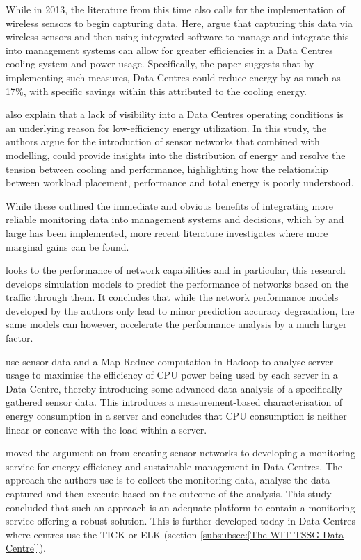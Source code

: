 \documentclass[12pt]{scrartcl}
\begin{document}
While in 2013, the literature from this time also calls for the implementation of wireless sensors to begin capturing data. Here, \citet{edssch.qt9c84f49g20130101} argue that capturing this data via wireless sensors and then using integrated software to manage and integrate this into management systems can allow for greater efficiencies in a Data Centres cooling system and power usage. Specifically, the paper suggests that by implementing such measures, Data Centres could reduce energy by as much as 17\%, with specific savings within this attributed to the cooling energy.

\citet{edsjsr.4134817120120101} also explain that a lack of visibility into a Data Centres operating conditions is an underlying reason for low-efficiency energy utilization. In this study, the authors argue for the introduction of sensor networks that combined with modelling, could provide insights into the distribution of energy and resolve the tension between cooling and performance, highlighting how the relationship between workload placement, performance and total energy is poorly understood.    

While these outlined the immediate and obvious benefits of integrating more reliable monitoring data into management systems and decisions, which by and large has been implemented, more recent literature investigates where more marginal gains can be found.  

\citet{edsdoj.47fdd5c4e23a43e3aa37ddd2fb75d82b20160101} looks to the performance of network capabilities and in particular, this research develops simulation models to predict the performance of networks based on the traffic through them. It concludes that while the  network performance models developed by the authors only lead to minor prediction accuracy degradation, the same models can however, accelerate the performance analysis by a much larger factor. 

\citet{edsarx.1402.080420140101} use sensor data and a Map-Reduce computation in Hadoop to analyse server usage to maximise the efficiency of CPU power being used by each server in a Data Centre, thereby introducing some advanced data analysis of a specifically gathered sensor data. This introduces a measurement-based characterisation of energy consumption in a server and concludes that CPU consumption is neither linear or concave with the load within a server. 

\citet{edsbas.DFD37F4F20160101} moved the argument on from creating sensor networks to developing a monitoring service for energy efficiency and sustainable management in Data Centres. The approach the authors use is to collect the monitoring data, analyse the data captured and then execute based on the outcome of the analysis. This study concluded that such an approach is an adequate platform to contain a monitoring service offering a robust solution. This is further developed today in Data Centres where centres use the TICK or ELK (section \ref{subsubsec:[The WIT-TSSG Data Centre]}).  
\end{document}
